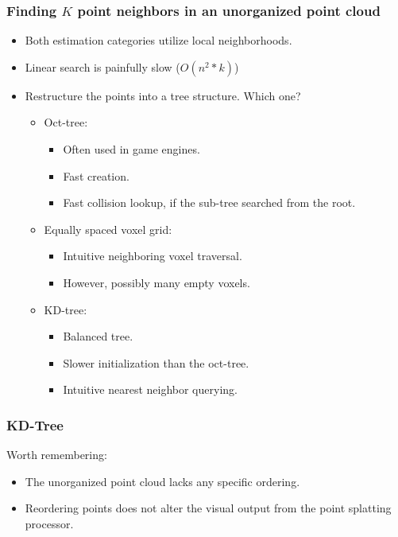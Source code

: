 \documentclass[11pt]{article}
\begin{document}
\subsubsection*{Finding \(K\) point neighbors in an unorganized point cloud}
\label{sec:orgdc1a1fa}
\begin{itemize}
\item Both estimation categories utilize local neighborhoods.
\item Linear search is painfully slow (\(O(n^2*k)\))
\item Restructure the points into a tree structure. Which one?
\begin{itemize}
\item Oct-tree:
\begin{itemize}
\item Often used in game engines.
\item Fast creation.
\item Fast collision lookup, if the sub-tree searched from the root.
\end{itemize}
\item Equally spaced voxel grid:
\begin{itemize}
\item Intuitive neighboring voxel traversal.
\item However, possibly many empty voxels.
\end{itemize}
\item KD-tree:
\begin{itemize}
\item Balanced tree.
\item Slower initialization than the oct-tree.
\item Intuitive nearest neighbor querying.
\end{itemize}
\end{itemize}
\end{itemize}

\subsubsection*{KD-Tree}
\label{sec:org4d4eccd}
Worth remembering:
\begin{itemize}
\item The unorganized point cloud lacks any specific ordering.
\item Reordering points does not alter the visual output from the point splatting processor.
\end{itemize}
\end{document}
